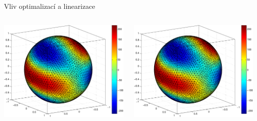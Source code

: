 \documentclass[lualatex,hyperref={pdfencoding=auto}]{beamer}
\begin{document}
\begin{frame}{Vliv optimalizací a linearizace}
  \begin{columns}
    \begin{column}{0.5\textwidth}
      \includegraphics[width=\textwidth]{fig/sphere_mix_real.pdf}
    \end{column}
    \begin{column}{0.5\textwidth}
      \includegraphics[width=\textwidth]{fig/sphere_mix_real.pdf}
    \end{column}
  \end{columns}
  \vspace{3mm}

\end{frame}
\end{document}
